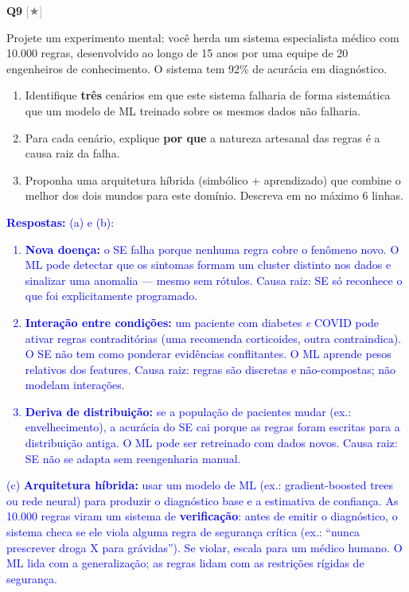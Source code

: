 \documentclass[12pt,a4paper]{article}
\newcommand{\sol}[1]{\textcolor{blue}{#1}}
\newcommand{\sol}[1]{}
\newcommand{\sol}[1]{}
\newcommand{\nivel}[1]{\textcolor{gray}{[#1]}}
\newenvironment{questao}[2]{
  \vspace{0.5cm}
  \noindent\textbf{Q#1} \nivel{#2} \quad
}{
  \vspace{0.2cm}
}
\begin{document}
\begin{questao}{9}{★}
  Projete um experimento mental: você herda um sistema especialista médico com
  10.000 regras, desenvolvido ao longo de 15 anos por uma equipe de 20 engenheiros
  de conhecimento. O sistema tem 92\% de acurácia em diagnóstico.

  \begin{enumerate}[label=(\alph*),nosep]
    \item Identifique \textbf{três} cenários em que este sistema falharia de forma
    sistemática que um modelo de ML treinado sobre os mesmos dados não falharia.
    \item Para cada cenário, explique \textbf{por que} a natureza artesanal das
    regras é a causa raiz da falha.
    \item Proponha uma arquitetura híbrida (simbólico + aprendizado) que combine
    o melhor dos dois mundos para este domínio. Descreva em no máximo 6 linhas.
  \end{enumerate}

  \sol{
    \textbf{Respostas:}
    (a) e (b):
    \begin{enumerate}[nosep]
      \item \textbf{Nova doença:} o SE falha porque nenhuma regra cobre o fenômeno novo.
      O ML pode detectar que os sintomas formam um cluster distinto nos dados e sinalizar
      uma anomalia — mesmo sem rótulos. Causa raiz: SE só reconhece o que foi explicitamente
      programado.
      \item \textbf{Interação entre condições:} um paciente com diabetes \textit{e} COVID
      pode ativar regras contraditórias (uma recomenda corticoides, outra contraindica).
      O SE não tem como ponderar evidências conflitantes. O ML aprende pesos relativos
      dos features. Causa raiz: regras são discretas e não-compostas; não modelam interações.
      \item \textbf{Deriva de distribuição:} se a população de pacientes mudar (ex.:
      envelhecimento), a acurácia do SE cai porque as regras foram escritas para a
      distribuição antiga. O ML pode ser retreinado com dados novos. Causa raiz: SE
      não se adapta sem reengenharia manual.
    \end{enumerate}

    (c) \textbf{Arquitetura híbrida:} usar um modelo de ML (ex.: gradient-boosted trees
    ou rede neural) para produzir o diagnóstico base e a estimativa de confiança. As
    10.000 regras viram um sistema de \textbf{verificação}: antes de emitir o diagnóstico,
    o sistema checa se ele viola alguma regra de segurança crítica (ex.: ``nunca prescrever
    droga X para grávidas''). Se violar, escala para um médico humano. O ML lida com a
    generalização; as regras lidam com as restrições rígidas de segurança.

}
\end{questao}
\end{document}

